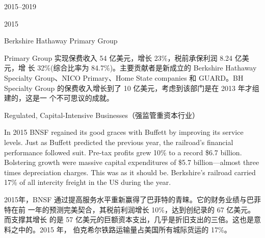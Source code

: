 \begin{chapter}{2015--2019}
\begin{section}{2015}
\begin{subsection}{Berkshire Hathaway Primary Group}
\begin{verseparallel}
{  }
  {
    Primary Group 实现保费收入 54 亿美元，增长 23\%，税前承保利润 8.24 亿美元，增
    长 32\%(综合比率为 84.7\%)。主要贡献者是新成立的 Berkshire Hathaway
    Specialty Group、NICO Primary、Home State companies 和 GUARD。BH Specialty
    Group 的保费收入增长到了 10 亿美元，考虑到该部门是在 2013 年才组建的，这是一
    个不可思议的成就。
  }
\end{verseparallel}

\end{subsection}

\begin{subsection}{Regulated, Capital-Intensive Businesses（强监管重资本行业）}
\begin{verseparallel}
  {

    In 2015 BNSF regained its good graces with Buffett by improving its service
    levels. Just as Buffett predicted the previous year, the railroad's
    financial performance followed suit. Pre-tax profits grew 10\% to a record
    \$6.7 billion. Bolstering growth were massive capital expenditures of \$5.7
    billion—almost three times depreciation charges. This was as it should be. Berkshire's railroad carried
    17\% of all intercity freight in the
    US during the year. \\

  }
  {
    2015年，BNSF 通过提高服务水平重新赢得了巴菲特的青睐。它的财务业绩与巴菲特在前
    一年的预测完美契合，其税前利润增长 10\%，达到创纪录的 67 亿美元。而支撑其增长
    的是 57 亿美元的巨额资本支出，几乎是折旧支出的三倍。这也是意料之中的。2015 年，
    伯克希尔铁路运输量占美国所有城际货运的 17\%。
  }
\end{verseparallel}


\end{subsection}
\end{section}
\end{chapter}
